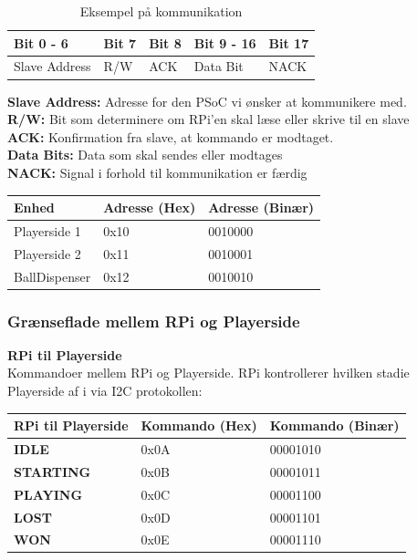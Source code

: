 \documentclass[Arkitektur/System_main.tex]{subfiles}
\begin{document}
\begin{table}[H]
    \centering
    \begin{tabular}{|L{0.2\textwidth}|L{0.15\textwidth}|L{0.15\textwidth}|L{0.15\textwidth}|L{0.15\textwidth}|}
\hline
\textbf{Bit 0 - 6} & \textbf{Bit 7} & \textbf{Bit 8} & \textbf{Bit 9 - 16}  & \textbf{Bit 17} \\ \hline
Slave Address & R/W & ACK & Data Bit & NACK \\ \hline
\end{tabular}
    \caption{Eksempel på kommunikation}
\end{table}

\textbf{Slave Address:} Adresse for den PSoC vi ønsker at kommunikere med. \\
\textbf{R/W:} Bit som determinere om RPi'en skal læse eller skrive til en slave \\
\textbf{ACK:} Konfirmation fra slave, at kommando er modtaget. \\
\textbf{Data Bits:} Data som skal sendes eller modtages\\
\textbf{NACK:} Signal i forhold til kommunikation er færdig \\

\begin{table}[H]
\centering
\begin{tabular}{|L{0.2\textwidth}|L{0.3\textwidth}|L{0.3\textwidth}|}
\hline
\textbf{Enhed} & \textbf{Adresse (Hex)} & \textbf{Adresse (Binær)} \\ \hline
Playerside 1 & 0x10 & 0010000 \\ \hline
Playerside 2 & 0x11 & 0010001 \\ \hline
BallDispenser & 0x12 & 0010010 \\ \hline
\end{tabular}
\end{table}

\subsubsection{Grænseflade mellem RPi og Playerside} \label{sec:RPi_Playerside_com}

\textbf{RPi til Playerside}
\\Kommandoer mellem RPi og Playerside. RPi kontrollerer hvilken stadie Playerside af i via I2C protokollen: 
\begin{table}[H]
\centering
\begin{tabular}{|L{0.3\textwidth}|L{0.3\textwidth}|L{0.3\textwidth}|}
\hline
\textbf{RPi til Playerside} & \textbf{Kommando (Hex)} & \textbf{Kommando (Binær)} \\ \hline
\textbf{IDLE} & 0x0A & 00001010 \\ \hline
\textbf{STARTING} & 0x0B & 00001011 \\ \hline
\textbf{PLAYING} & 0x0C & 00001100 \\ \hline
\textbf{LOST} & 0x0D & 00001101 \\ \hline
\textbf{WON} & 0x0E & 00001110 \\ \hline
\end{tabular}

\end{table}
\end{document}
